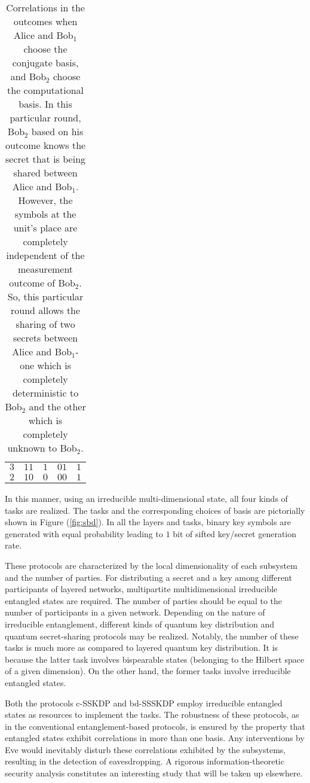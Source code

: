 \documentclass[fleqn,10pt]{wlscirep}
\begin{document}
\begin{table}[h!]
\begin{tabular}{|c|c|c|c|c|}
     $3$ & {\color{blue}$1$}{\color{red}$1$} & $1$ & {\color{blue} $0$}{\color{red}$1$} & {\color{blue}$1$} \\
   \rowcolor{lightgray}   $2$ & {\color{blue}$1$}{\color{red}$0$} & $0$ & {\color{blue}$0$}{\color{red}$0$} & {\color{blue}$1$} \\
    \hline
    \end{tabular}
    \caption{Correlations in the outcomes when Alice and Bob$_1$ choose the conjugate basis, and Bob$_2$ choose the computational basis. In this particular round, Bob$_2$ based on his outcome knows the secret that is being shared between Alice and Bob$_1$. However, the symbols at the unit's place are completely independent of the measurement outcome of Bob$_2$. So, this particular round allows the sharing of two secrets between Alice and Bob$_1$- one which is completely deterministic to Bob$_2$ and the other which is completely unknown to Bob$_2$. }
    \label{tab:skdss2}
\end{table}


In this manner, using an irreducible multi-dimensional state, all four kinds of tasks are realized. The tasks and the corresponding choices of basis are pictorially shown in Figure (\ref{fig:sbd}). In all the layers and tasks, binary key symbols are generated with equal probability leading to $1$ bit of sifted key/secret generation rate.


These protocols are characterized by the local dimensionality of each subsystem and the number of parties. For distributing a secret and a key among different participants of layered networks,  multipartite multidimensional irreducible entangled states are required. The number of parties should be equal to the number of participants in a given network. Depending on the nature of irreducible entanglement, different kinds of quantum key distribution and quantum secret-sharing protocols may be realized. Notably, the number of these tasks is much more as compared to layered quantum key distribution. It is because the latter task involves bispearable states (belonging to the Hilbert space of a given dimension). On the other hand, the former tasks involve irreducible entangled states.


Both the protocols c-SSKDP and bd-SSSKDP employ irreducible entangled states as resources to implement the tasks. The robustness of these protocols, as in the conventional entanglement-based protocols, is ensured by the property that entangled states exhibit correlations in more than one basis. Any interventions by Eve would inevitably disturb these correlations exhibited by the subsystems, resulting in the detection of eavesdropping. A rigorous information-theoretic security analysis constitutes an interesting study that will be taken up elsewhere.
\end{document}
